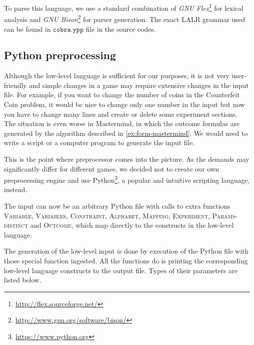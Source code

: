 To parse this language, we use a standard combination of
\emph{GNU Flex}\footnote{\url{http://flex.sourceforge.net/}} for lexical analysis and
\emph{GNU Bison}\footnote{\url{http://www.gnu.org/software/bison/}} for parser generation.
The exact LALR grammar used can be found in $\texttt{cobra.ypp}$ file
  in the source codes.

\subsection{Python preprocessing}

Although the low-level language is sufficient for our purposes,
  it is not very user-friendly and
  simple changes in a game may require extensive changes in the input file.
For example, if you want to change the number of coins in the Counterfeit Coin problem,
  it would be nice to change only one number in the input
  but now you have to change many lines and create or delete some experiment sections.
The situation is even worse in Mastermind, in which the outcome formulas are
  generated by the algorithm described in \ref{ex:form-mastermind}.
We would need to write a script or a computer program to generate the input file.

This is the point where preprocessor comes into the picture.
As the demands may significantly differ for different games,
  we decided not to create our own preprocessing engine
  and use Python\footnote{\url{https://www.python.org}},
  a popular and intuitive scripting language, instead.

The input can now be an arbitrary Python file with calls to extra functions
\textsc{Variable}, \textsc{Variables}, \textsc{Constraint}, \textsc{Alphabet},
\textsc{Mapping}, \textsc{Experiment}, \textsc{Params-distinct} and \textsc{Outcome},
which map directly to the constructs in the low-level language.

The generation of the low-level input is done by execution of the Python file
  with those special function ingested.
All the functions do is printing the corresponding low-level language constructs
  to the output file.
Types of their parameters are listed below.

